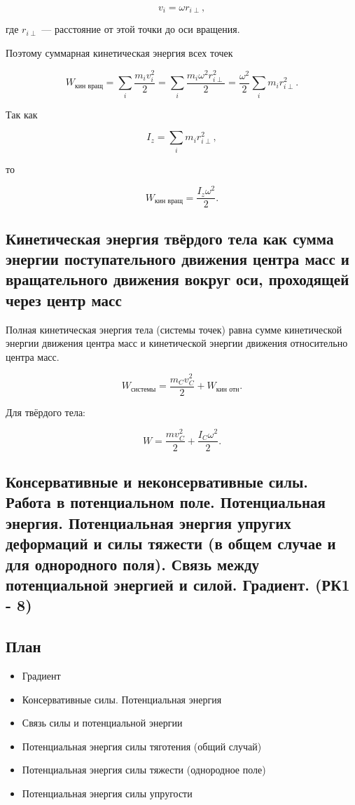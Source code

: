 \documentclass[a4paper,12pt]{article}
\begin{document}
\[
v_i = \omega r_{i\perp},
\]

где $r_{i\perp}$ — расстояние от этой точки до оси вращения.

Поэтому суммарная кинетическая энергия всех точек

\[
W_{\text{кин вращ}}
=
\sum_i \frac{m_i v_i^2}{2}
=
\sum_i \frac{m_i \omega^2 r_{i\perp}^2}{2}
=
\frac{\omega^2}{2}
\sum_i m_i r_{i\perp}^2.
\]

Так как

\[
I_z = \sum_i m_i r_{i\perp}^2,
\]

то

\[
W_{\text{кин вращ}} = \frac{I_z \omega^2}{2}.
\]

\vspace{0.8em}

\subsection*{Кинетическая энергия твёрдого тела как сумма энергии поступательного движения центра масс и вращательного движения вокруг оси, проходящей через центр масс}

Полная кинетическая энергия тела (системы точек) равна сумме кинетической энергии движения центра масс и кинетической энергии движения относительно центра масс.

\[
W_{\text{системы}}
=
\frac{m_C v_C^2}{2}
+
W_{\text{кин отн}}.
\]

Для твёрдого тела:

\[
W
=
\frac{m v_C^2}{2}
+
\frac{I_C \omega^2}{2}.
\]

\subsection{Консервативные и неконсервативные силы. Работа в потенциальном поле. Потенциальная энергия. Потенциальная энергия упругих деформаций и силы тяжести (в общем случае и для однородного поля). Связь между потенциальной энергией и силой. Градиент. (РК1 - 8)}

\subsection*{План}
\begin{itemize}
\item Градиент
\item Консервативные силы. Потенциальная энергия
\item Связь силы и потенциальной энергии
\item Потенциальная энергия силы тяготения (общий случай)
\item Потенциальная энергия силы тяжести (однородное поле)
\item Потенциальная энергия силы упругости
\end{itemize}
\end{document}
